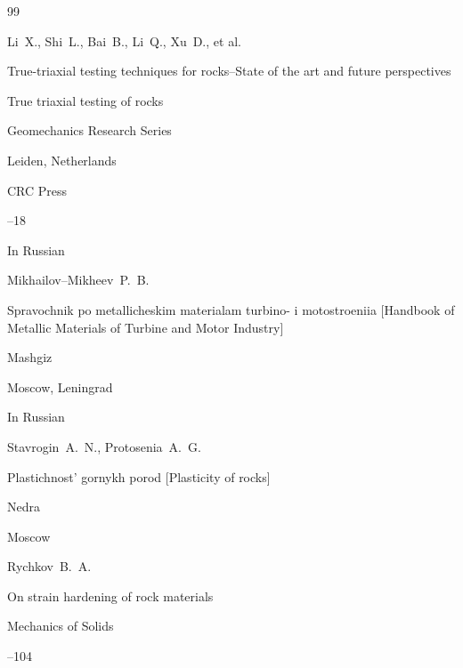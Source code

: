 \begin{thebibliography}{99}





\by Li~X., Shi~L., Bai~B., Li~Q., Xu~D., et al.

\paper True-triaxial testing techniques for rocks--State of the art and future perspectives 

\inbook True triaxial testing of rocks

\serial  Geomechanics Research Series



\publaddr Leiden,  Netherlands

\publ CRC Press

--18







\lang In Russian

\by Mikhailov--Mikheev~P.~B.

\book Spravochnik po metallicheskim materialam turbino- i motostroeniia \rm [Handbook of Metallic Materials of Turbine and Motor Industry]


\publ Mashgiz

\publaddr Moscow, Leningrad







\lang In Russian

\by Stavrogin~A.~N., Protosenia~A.~G.

\book Plastichnost' gornykh porod \rm [Plasticity of rocks]


\publ Nedra

\publaddr Moscow







\by Rychkov~B.~A.

\paper On strain hardening of rock materials

\jour Mechanics of Solids 




--104



\end{thebibliography}





%

